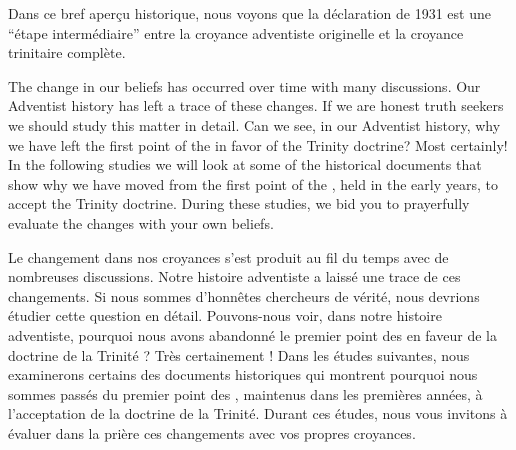 Dans ce bref aperçu historique, nous voyons que la déclaration de 1931 est une “étape intermédiaire” entre la croyance adventiste originelle et la croyance trinitaire complète.


The change in our beliefs has occurred over time with many discussions. Our Adventist history has left a trace of these changes. If we are honest truth seekers we should study this matter in detail. Can we see, in our Adventist history, why we have left the first point of the  in favor of the Trinity doctrine? Most certainly! In the following studies we will look at some of the historical documents that show why we have moved from the first point of the , held in the early years, to accept the Trinity doctrine. During these studies, we bid you to prayerfully evaluate the changes with your own beliefs.


Le changement dans nos croyances s'est produit au fil du temps avec de nombreuses discussions. Notre histoire adventiste a laissé une trace de ces changements. Si nous sommes d'honnêtes chercheurs de vérité, nous devrions étudier cette question en détail. Pouvons-nous voir, dans notre histoire adventiste, pourquoi nous avons abandonné le premier point des  en faveur de la doctrine de la Trinité ? Très certainement ! Dans les études suivantes, nous examinerons certains des documents historiques qui montrent pourquoi nous sommes passés du premier point des , maintenus dans les premières années, à l'acceptation de la doctrine de la Trinité. Durant ces études, nous vous invitons à évaluer dans la prière ces changements avec vos propres croyances.
